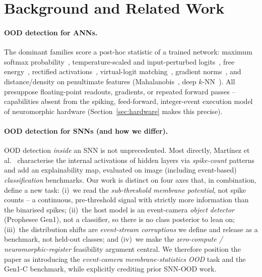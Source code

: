 \section{Background and Related Work}
\label{sec:related}

\paragraph{OOD detection for ANNs.}
The dominant families score a post-hoc statistic of a trained network: maximum softmax
probability~\cite{hendrycks2017msp}, temperature-scaled and input-perturbed
logits~\cite{liang2018odin}, free energy~\cite{liu2020energy}, rectified
activations~\cite{sun2021react}, virtual-logit matching~\cite{wang2022vim}, gradient
norms~\cite{huang2021gradnorm}, and distance/density on penultimate features
(Mahalanobis~\cite{lee2018mahalanobis}, deep $k$-NN~\cite{sun2022knn}). All presuppose
floating-point readouts, gradients, or repeated forward passes -- capabilities absent from
the spiking, feed-forward, integer-event execution model of neuromorphic hardware
(Section~\ref{sec:hardware} makes this precise).

\paragraph{OOD detection for SNNs (and how we differ).}
OOD detection \emph{inside} an SNN is not unprecedented. Most directly, Mart\'inez et al.~\cite{martinez2023snnood}
characterise the internal activations of hidden layers via \emph{spike-count} patterns and add
an explainability map, evaluated on image (including event-based) \emph{classification}
benchmarks. Our work is distinct on four axes that, in combination, define a new task:
(i)~we read the \emph{sub-threshold membrane potential}, not spike counts -- a continuous,
pre-threshold signal with strictly more information than the binarised spikes;
(ii)~the host model is an event-camera \emph{object detector} (Prophesee Gen1), not a
classifier, so there is no class posterior to lean on; (iii)~the distribution shifts are
\emph{event-stream corruptions} we define and release as a benchmark, not held-out classes;
and (iv)~we make the \emph{zero-compute / neuromorphic-register} feasibility argument central.
We therefore position the paper as introducing the \emph{event-camera membrane-statistics OOD}
task and the Gen1-C benchmark, while explicitly crediting prior SNN-OOD work.

